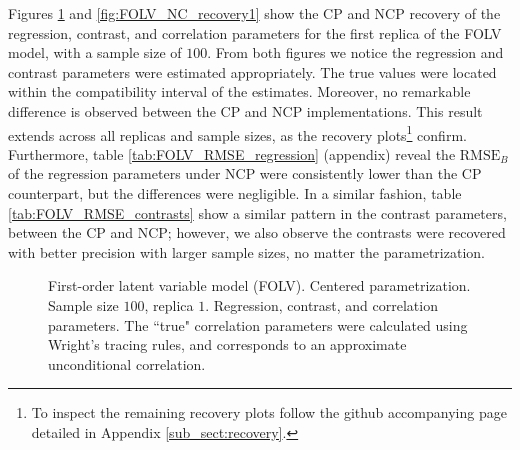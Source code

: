 Figures \ref{fig:FOLV_CE_recovery1} and \ref{fig:FOLV_NC_recovery1} show the CP and NCP recovery of the regression, contrast, and correlation parameters for the first replica of the FOLV model, with a sample size of $100$. From both figures we notice the regression and contrast parameters were estimated appropriately. The true values were located within the compatibility interval of the estimates. Moreover, no remarkable difference is observed between the CP and NCP implementations. This result extends across all replicas and sample sizes, as the recovery plots\footnote{To inspect the remaining recovery plots follow the github accompanying page detailed in Appendix \ref{sub_sect:recovery}.} confirm. Furthermore, table \ref{tab:FOLV_RMSE_regression} (appendix) reveal the $\text{RMSE}_{B}$ of the regression parameters under NCP were consistently lower than the CP counterpart, but the differences were negligible. In a similar fashion, table \ref{tab:FOLV_RMSE_contrasts} show a similar pattern in the contrast parameters, between the CP and NCP; however, we also observe the contrasts were recovered with better precision with larger sample sizes, no matter the parametrization.
%
\begin{figure}[H]
	\centering
	\begin{subfigure}
		\texttt{[image: FOLV\_CE\_J100\_Ndata1\_regression]}
	\end{subfigure}
	\begin{subfigure}
		\texttt{[image: FOLV\_CE\_J100\_Ndata1\_corr]}
	\end{subfigure}
	\caption[First-order latent variable model (FOLV). Centered parametrization. Sample size $100$, replica $1$. Regression, contrast, and correlation parameters.]%
	{First-order latent variable model (FOLV). Centered parametrization. Sample size $100$, replica $1$. Regression, contrast, and correlation parameters. The ``true" correlation parameters were calculated using Wright's tracing rules, and corresponds to an approximate unconditional correlation.}
	\label{fig:FOLV_CE_recovery1}
\end{figure}

